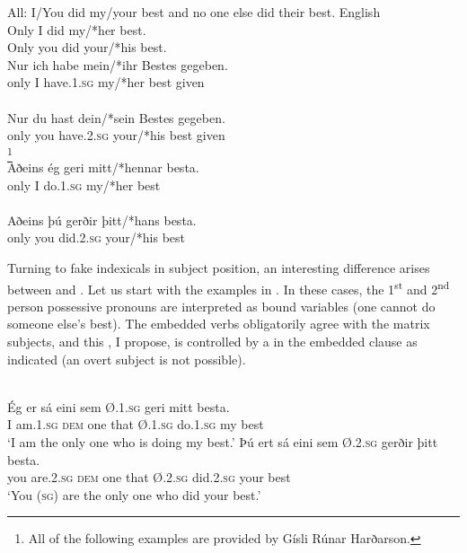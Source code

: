\documentclass[output=paper]{LSP/langsci}
\begin{document}
\ea \label{ex:wurmbrand:2}
All: I/You did my/your best and no one else did their best.   
\ea
 English\\
Only I did my/*her best.
\ex
 \\
Only you did your/*his best.  
\ex
  \\
\gll Nur  ich  habe  mein/*ihr  Bestes  gegeben.\\
only  I  have.\textsc{1.sg}  my/*her  best  given\\
\ex
  \\
\gll Nur  du  hast  dein/*sein  Bestes  gegeben.\\
only  you  have.\textsc{2.sg}  your/*his  best  given\\
\newpage
\ex
{}\footnote{ All of the following  examples are provided by Gísli Rúnar Harðarson.}\\
\gll  Aðeins ég  geri  mitt/*hennar  besta.\\
only  I  do.1.\textsc{sg}  my/*her  best\\
\ex
  \\
\gll Aðeins  þú  gerðir  þitt/*hans  besta.\\
only  you  did.2.\textsc{sg}  your/*his  best\\
\z
\z

Turning to fake indexicals in subject position, an interesting difference arises between  and . Let us start with the  examples in . In these cases, the 1\textsuperscript{st} and 2\textsuperscript{nd} person possessive pronouns are interpreted as bound variables (one cannot do someone else’s best). The embedded verbs obligatorily agree with the matrix subjects, and this , I  propose, is controlled by a  in the embedded clause as indicated (an overt subject is not possible).

\ea  \label{ex:wurmbrand:3}
\\
\ea
\gll  Ég  er  sá  eini  sem Ø.1.\textsc{sg}  geri  mitt  besta.\\
I  am.1.\textsc{sg}  \textsc{dem}  one  that  Ø.1.\textsc{sg}  do.1.\textsc{sg}  my  best\\
\glt  ‘I am the only one who is doing my best.’
\ex
\gll  Þú  ert  sá  eini  sem Ø.2.\textsc{sg}  gerðir  þitt  besta.\\
you  are.2.\textsc{sg}  \textsc{dem}  one  that  Ø.2.\textsc{sg}  did.2.\textsc{sg}  your  best\\
\glt  ‘You (\textsc{sg}) are the only one who did your best.’
\z
\z
\end{document}
